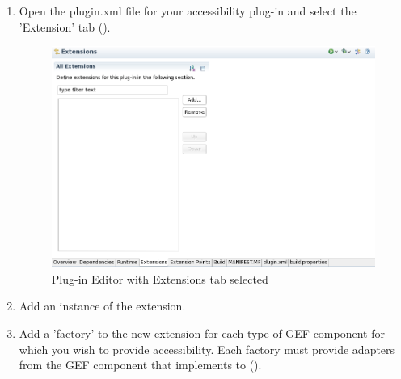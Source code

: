 \begin{enumerate}
\item  Open the plugin.xml file for your accessibility plug-in and select the 'Extension' tab ().

\begin{figure}[h]
\begin{center}
\includegraphics[width=12.5cm]{Toolkit/GEF/PS/extensionstab}
\caption{Plug-in Editor with Extensions tab selected}
\label{extensionstab}
\end{center}
\end{figure}

\item Add an instance of the  extension. 
\item Add a 'factory' to the new extension for each type of GEF component for which you wish to provide accessibility. Each factory must provide adapters from the GEF component that implements  to  ().


\end{enumerate}
